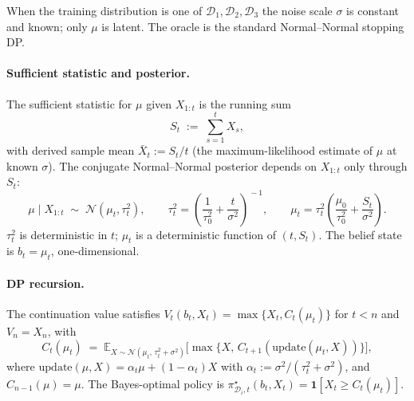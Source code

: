 \documentclass[11pt]{article}
\begin{document}
When the training distribution is one of $\mathcal{D}_1, \mathcal{D}_2, \mathcal{D}_3$ the noise scale $\sigma$ is constant and known; only $\mu$ is latent. The oracle is the standard Normal--Normal stopping DP.

\paragraph{Sufficient statistic and posterior.} The sufficient statistic for $\mu$ given $X_{1:t}$ is the running sum
\[
S_t \;:=\; \sum_{s=1}^t X_s,
\]
with derived sample mean $\bar X_t := S_t / t$ (the maximum-likelihood estimate of $\mu$ at known $\sigma$). The conjugate Normal--Normal posterior depends on $X_{1:t}$ only through $S_t$:
\begin{equation}
\label{eq:mu-static}
\mu \mid X_{1:t} \;\sim\; \mathcal{N}(\mu_t, \tau_t^2),
\qquad
\tau_t^2 = \!\left(\frac{1}{\tau_0^2} + \frac{t}{\sigma^2}\right)^{\!-1},
\qquad
\mu_t = \tau_t^2\!\left(\frac{\mu_0}{\tau_0^2} + \frac{S_t}{\sigma^2}\right).
\end{equation}
$\tau_t^2$ is deterministic in $t$; $\mu_t$ is a deterministic function of $(t, S_t)$. The belief state is $b_t = \mu_t$, one-dimensional.

\paragraph{DP recursion.} The continuation value satisfies $V_t(b_t, X_t) = \max\{X_t, C_t(\mu_t)\}$ for $t < n$ and $V_n = X_n$, with
\begin{equation}
\label{eq:Crec-static}
C_t(\mu_t) \;=\; \mathbb{E}_{X \sim \mathcal{N}(\mu_t,\, \tau_t^2 + \sigma^2)}\!\Big[\max\!\big\{X,\, C_{t+1}(\mathrm{update}(\mu_t, X))\big\}\Big],
\end{equation}
where $\mathrm{update}(\mu, X) = \alpha_t \mu + (1 - \alpha_t) X$ with $\alpha_t := \sigma^2/(\tau_t^2 + \sigma^2)$, and $C_{n-1}(\mu) = \mu$. The Bayes-optimal policy is $\pi^\star_{\mathcal{D}_i, t}(b_t, X_t) = \mathbf{1}[X_t \ge C_t(\mu_t)]$.
\end{document}
